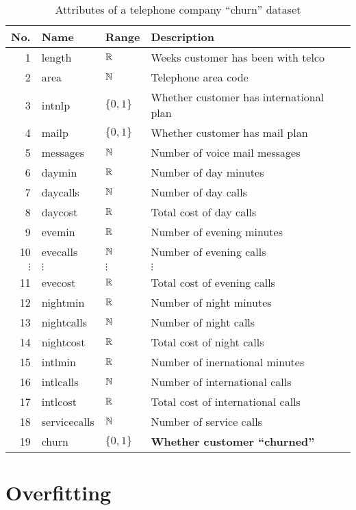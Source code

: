 \begin{table}
\newcommand{\szo}{\{0,1\}}
\begin{tabular}{r l l l}
\hline
{\bf No.} & {\bf Name} & {\bf Range} & {\bf Description} \\
\hline\hline
 1 & length      & $\mathbb{R}$ & Weeks customer has been with telco \\
 2 & area        & $\mathbb{N}$ & Telephone area code \\
 3 & intnlp      & $\szo$ & Whether customer has international plan \\
 4 & mailp       & $\szo$ & Whether customer has mail plan \\
 5 & messages    & $\mathbb{N}$ & Number of voice mail messages \\
 6 & daymin      & $\mathbb{R}$ & Number of day minutes \\
 7 & daycalls    & $\mathbb{N}$ & Number of day calls \\
 8 & daycost     & $\mathbb{R}$ & Total cost of day calls \\
 9 & evemin      & $\mathbb{R}$ & Number of evening minutes \\
10 & evecalls    & $\mathbb{N}$ & Number of evening calls \\
$\vdots$ & $\vdots$ & $\vdots$ & $\vdots$ \\

11 & evecost     & $\mathbb{R}$ & Total cost of evening calls \\
12 & nightmin    & $\mathbb{R}$ & Number of night minutes \\
13 & nightcalls  & $\mathbb{N}$ & Number of night calls \\
14 & nightcost   & $\mathbb{R}$ & Total cost of night calls \\
15 & intlmin     & $\mathbb{R}$ & Number of inernational minutes \\
16 & intlcalls   & $\mathbb{N}$ & Number of international calls \\
17 & intlcost    & $\mathbb{R}$ & Total cost of international calls \\
18 & servicecalls& $\mathbb{N}$ & Number of service calls \\
19 & churn       & $\szo$ & {\bf Whether customer ``churned''} \\
\hline
\end{tabular}
\caption{Attributes of a telephone company ``churn'' dataset}
\label{table:churn attributes}
\end{table}

\section{Overfitting}

